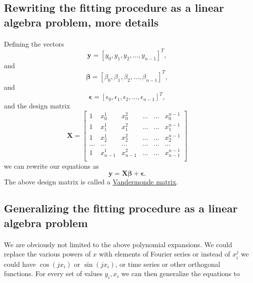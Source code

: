 \documentclass[%
oneside,                 %
final,                   %
10pt]{article}
\begin{document}
\subsection{Rewriting the fitting procedure as a linear algebra problem, more details}

\paragraph{}
Defining the vectors
\[
\bm{y} = [y_0,y_1, y_2,\dots, y_{n-1}]^T,
\]
and
\[
\bm{\beta} = [\beta_0,\beta_1, \beta_2,\dots, \beta_{n-1}]^T,
\]
and
\[
\bm{\epsilon} = [\epsilon_0,\epsilon_1, \epsilon_2,\dots, \epsilon_{n-1}]^T,
\]
and the design matrix
\[
\bm{X}=
\begin{bmatrix} 
1& x_{0}^1 &x_{0}^2& \dots & \dots &x_{0}^{n-1}\\
1& x_{1}^1 &x_{1}^2& \dots & \dots &x_{1}^{n-1}\\
1& x_{2}^1 &x_{2}^2& \dots & \dots &x_{2}^{n-1}\\                      
\dots& \dots &\dots& \dots & \dots &\dots\\
1& x_{n-1}^1 &x_{n-1}^2& \dots & \dots &x_{n-1}^{n-1}\\
\end{bmatrix} 
\]
we can rewrite our equations as
\[
\bm{y} = \bm{X}\bm{\beta}+\bm{\epsilon}.
\]
The above design matrix is called a \href{{https://en.wikipedia.org/wiki/Vandermonde_matrix}}{Vandermonde matrix}.




\subsection{Generalizing the fitting procedure as a linear algebra problem}

\paragraph{}

We are obviously not limited to the above polynomial expansions.  We
could replace the various powers of $x$ with elements of Fourier
series or instead of $x_i^j$ we could have $\cos{(j x_i)}$ or $\sin{(j
x_i)}$, or time series or other orthogonal functions.  For every set
of values $y_i,x_i$ we can then generalize the equations to
\end{document}
